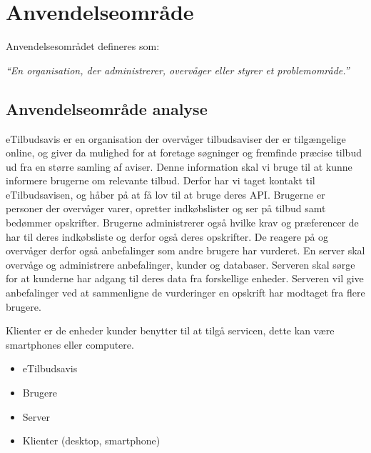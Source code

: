 \chapter{Anvendelseområde}
Anvendelsesområdet defineres som:

\textit{``En organisation, der administrerer, overvåger eller styrer et problemområde.''}

\section{Anvendelseområde analyse}
eTilbudsavis er en organisation der overvåger tilbudsaviser der er tilgængelige online, og giver da mulighed for at foretage søgninger og fremfinde præcise tilbud ud fra en større samling af aviser.
Denne information skal vi bruge til at kunne informere brugerne om relevante tilbud.
Derfor har vi taget kontakt til eTilbudsavisen, og håber på at få lov til at bruge deres API.
Brugerne er personer der overvåger varer, opretter indkøbslister og ser på tilbud samt bedømmer opskrifter.
Brugerne administrerer også hvilke krav og præferencer de har til deres indkøbsliste og derfor også deres opskrifter.
De reagere på og overvåger derfor også anbefalinger som andre brugere har vurderet.
En server skal overvåge og administrere anbefalinger, kunder og databaser.
Serveren skal sørge  for at kunderne har adgang til deres data fra forskellige enheder.
Serveren vil give anbefalinger ved at sammenligne de vurderinger en opskrift har modtaget fra flere brugere.

Klienter er de enheder kunder benytter til at tilgå servicen, dette kan være smartphones eller computere.

\begin{itemize}
  \item eTilbudsavis
  \item Brugere
  \item Server
  \item Klienter (desktop, smartphone)
\end{itemize}
